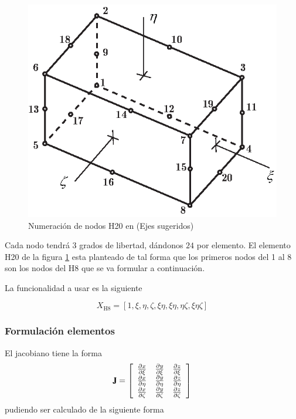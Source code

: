 \begin{figure}[htb!]
    \centering
    \includegraphics[width=.6\textwidth]{fig/H20numbering.eps}
    \caption{Numeración de nodos H20 en \Adina (Ejes sugeridos)}
    \label{fig:H20numbering}
\end{figure}

Cada nodo tendrá $3$ grados de libertad, dándonos $24$ \dof{} por elemento. El elemento H20 de la figura \ref{fig:H20numbering} esta planteado de tal forma que los primeros nodos del 1 al 8 son los nodos del H8 que se va formular a continuación.

La funcionalidad a usar es la siguiente

\[
X_{\mathrm{H8}} = \left[1, \xi, \eta, \zeta, \xi \eta, \xi \eta, \eta \zeta, \xi \eta \zeta \right]
\]



\subsubsection*{Formulación elementos}
El jacobiano tiene la forma
\[
\jac=
\left[\begin{array}{lll}\spartial{x}{\xi} & \spartial{y}{\xi}  & \spartial{z}{\xi}  \\ \spartial{x}{\eta}  &\spartial{y}{\eta}  &\spartial{z}{\eta} \\\spartial{x}{\zeta} & \spartial{y}{\zeta} &\spartial{z}{\zeta}\end{array}\right]
\]
pudiendo ser calculado de la siguiente forma

